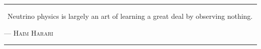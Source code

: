 \vspace*{3pc}
\begin{center}
\begin{minipage}{0.7\linewidth}
\hrule
\vspace{8pt}
{\huge\guillemotleft} ~Neutrino physics is largely an art of learning a great deal by observing nothing. {\huge\guillemotright} \\
\vspace{2pt}
\begin{flushright}
--- \textsc{Haim Harari}
\end{flushright}
\vspace{8pt}
\hrule
\end{minipage}
\end{center}
\vspace{3pc}



